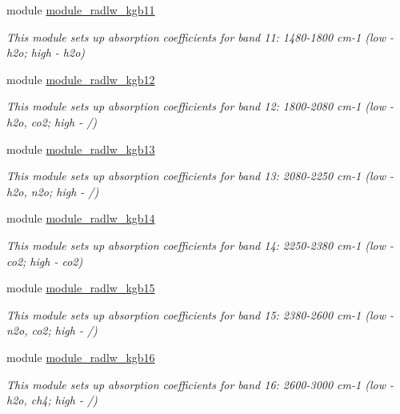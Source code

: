 \begin{DoxyCompactItemize}
module \hyperlink{namespacemodule__radlw__kgb11}{module\+\_\+radlw\+\_\+kgb11}
\begin{DoxyCompactList}\small\item\em This module sets up absorption coefficients for band 11\+: 1480-\/1800 cm-\/1 (low -\/ h2o; high -\/ h2o) \end{DoxyCompactList}\item 
module \hyperlink{namespacemodule__radlw__kgb12}{module\+\_\+radlw\+\_\+kgb12}
\begin{DoxyCompactList}\small\item\em This module sets up absorption coefficients for band 12\+: 1800-\/2080 cm-\/1 (low -\/ h2o, co2; high -\/ /) \end{DoxyCompactList}\item 
module \hyperlink{namespacemodule__radlw__kgb13}{module\+\_\+radlw\+\_\+kgb13}
\begin{DoxyCompactList}\small\item\em This module sets up absorption coefficients for band 13\+: 2080-\/2250 cm-\/1 (low -\/ h2o, n2o; high -\/ /) \end{DoxyCompactList}\item 
module \hyperlink{namespacemodule__radlw__kgb14}{module\+\_\+radlw\+\_\+kgb14}
\begin{DoxyCompactList}\small\item\em This module sets up absorption coefficients for band 14\+: 2250-\/2380 cm-\/1 (low -\/ co2; high -\/ co2) \end{DoxyCompactList}\item 
module \hyperlink{namespacemodule__radlw__kgb15}{module\+\_\+radlw\+\_\+kgb15}
\begin{DoxyCompactList}\small\item\em This module sets up absorption coefficients for band 15\+: 2380-\/2600 cm-\/1 (low -\/ n2o, co2; high -\/ /) \end{DoxyCompactList}\item 
module \hyperlink{namespacemodule__radlw__kgb16}{module\+\_\+radlw\+\_\+kgb16}
\begin{DoxyCompactList}\small\item\em This module sets up absorption coefficients for band 16\+: 2600-\/3000 cm-\/1 (low -\/ h2o, ch4; high -\/ /) \end{DoxyCompactList}\end{DoxyCompactItemize}

